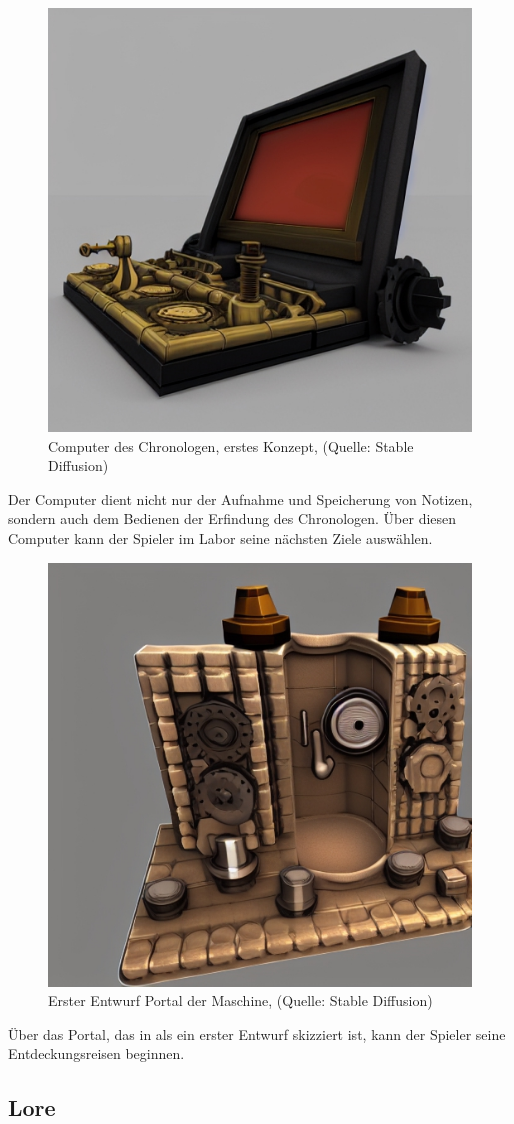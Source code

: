 \begin{figure}[ht]
\centering
\includegraphics[width=0.6\linewidth]{content/pictures/bsp_computer_03.jpg}
\caption{Computer des Chronologen, erstes Konzept, (Quelle: Stable Diffusion)}
\label{fig:bsp_computer_03}
\end{figure}
Der Computer dient nicht nur der Aufnahme und Speicherung von Notizen, sondern auch dem Bedienen der Erfindung des Chronologen. Über diesen Computer kann der Spieler im Labor seine nächsten Ziele auswählen.

\begin{figure}[ht]
\centering
\includegraphics[width=0.6\linewidth]{content/pictures/portal_01.jpg}
\caption{Erster Entwurf Portal der Maschine, (Quelle: Stable Diffusion)}
\label{fig:portal_01}
\end{figure}
Über das Portal, das in  als ein erster Entwurf skizziert ist, kann der Spieler seine Entdeckungsreisen beginnen.

\newpage
\subsection{Lore}

